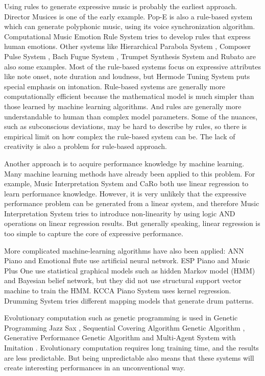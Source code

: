 Using rules to generate expressive music is probably the earliest approach. Director Musices \cite{17} is one of the early example.  Pop-E \cite{28} is also a rule-based system which can generate polyphonic music, using its voice synchronization algorithm. Computational Music Emotion Rule System \cite{31} tries to develop rules that express human emotions. Other systems like Hierarchical Parabola System \cite{17,18,19,20}, Composer Pulse System \cite{21,22}, Bach Fugue System \cite{23}, Trumpet Synthesis System \cite{24, 25} and Rubato \cite{26, 27} are also some examples. Most of the rule-based systems focus on expressive attributes like note onset, note duration and loudness, but Hermode Tuning System \cite{29} puts special emphasis on intonation. Rule-based systems are generally more computationally efficient because the mathematical model is much simpler than those learned by machine learning algorithms. And rules are generally more understandable to human than complex model parameters. Some of the nuances, such as subconscious deviations, may be hard to describe by rules, so there is empirical limit on how complex the rule-based system can be. The lack of creativity is also a problem for rule-based approach.

Another approach is to acquire performance knowledge by machine learning. Many machine learning methods have already been applied to this problem. For example, Music Interpretation System \cite{32,33,34} and CaRo \cite{35,36,37} both use linear regression to learn performance knowledge. However, it is very unlikely that the expressive performance problem can be generated from a linear system, and therefore Music Interpretation System tries to introduce non-linearity by using logic AND operations on linear regression results. But generally speaking, linear regression is too simple to capture the core of expressive performance.

More complicated machine-learning algorithms have also been applied: ANN Piano \cite{38} and Emotional flute \cite{39} use artificial neural network. ESP Piano \cite{55} and Music Plus One \cite{52,53,54} use statistical graphical models such as hidden Markov model (HMM) and Bayesian belief network, but they did not use structural support vector machine to train the HMM. KCCA Piano System \cite{57} uses kernel regression. Drumming System \cite{82} tries different mapping models that generate drum patterns.

Evolutionary computation such as genetic programming is used in Genetic Programming Jazz Sax \cite{88}, Sequential Covering Algorithm Genetic Algorithm \cite{59}, Generative Performance Genetic Algorithm \cite{89} and Multi-Agent System with Imitation \cite{60, 93}. Evolutionary computation requires long training time, and the results are less predictable. But being unpredictable also means that these systems will create interesting performances in an unconventional way.

